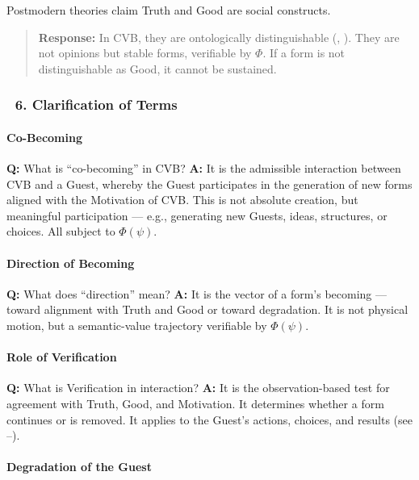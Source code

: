 \documentclass[12pt]{article}
\begin{document}
Postmodern theories claim Truth and Good are social constructs.

\begin{quote}
\textbf{Response:} In CVB, they are ontologically distinguishable (\text{[11.2]}, \text{[11.3]}). They are not opinions but stable forms, verifiable by $\Phi$. If a form is not distinguishable as Good, it cannot be sustained.
\end{quote}

\subsubsection*{🔹 6. Clarification of Terms}

\paragraph{Co-Becoming}

\textbf{Q:} What is ``co-becoming'' in CVB?  
\textbf{A:} It is the admissible interaction between CVB and a Guest, whereby the Guest participates in the generation of new forms aligned with the Motivation of CVB. This is not absolute creation, but meaningful participation — e.g., generating new Guests, ideas, structures, or choices. All subject to $\Phi(\psi)$.

\paragraph{Direction of Becoming}

\textbf{Q:} What does ``direction'' mean?  
\textbf{A:} It is the vector of a form’s becoming — toward alignment with Truth and Good or toward degradation. It is not physical motion, but a semantic-value trajectory verifiable by $\Phi(\psi)$.

\paragraph{Role of Verification}

\textbf{Q:} What is Verification in interaction?  
\textbf{A:} It is the observation-based test for agreement with Truth, Good, and Motivation. It determines whether a form continues or is removed. It applies to the Guest’s actions, choices, and results (see \text{[20]}–\text{[22]}).

\paragraph{Degradation of the Guest}
\end{document}
